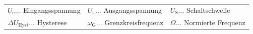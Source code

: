 		\begin{table}[h]
		\begin{tabular}{lll}
		$U_{\mathrm{e}}\dots$ Eingangsspannung & $U_{\mathrm{a}}\dots$ Ausgangsspannung & $U_{\mathrm{S}}\dots$ Schaltschwelle\\
		$\Delta U_{\mathrm{Hyst}}\dots$ Hysterese & $\omega_{\mathrm{G}}\dots$ Grenzkreisfrequenz & $\Omega\dots$ Normierte Frequenz\\
		\end{tabular}
		\end{table}
\clearpage

